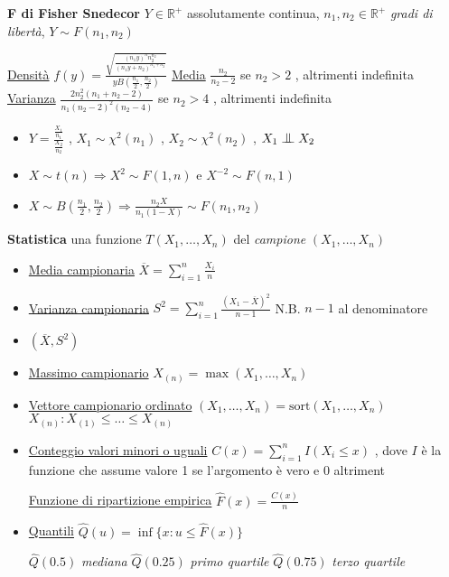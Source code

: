 \documentclass[openany]{book} %
\newcommand{\ind}{\mathrel{\text{\scalebox{1.07}{$\perp\mkern-10mu\perp$}}}}
\begin{document}
\textbf{F di Fisher Snedecor} $Y\in \mathbb{R}^+$ assolutamente continua, $n_1,n_2\in \mathbb{R}^+$ \textit{gradi di libertà}, $Y\sim F(n_1,n_2)$

\underline{Densità} $f(y)=\frac{\sqrt{\frac{(n_1y)^nn_2^{n_2}}{(n_1y+n_2)^{n_1+n_2}}}}{yB(\frac{n_1}{2},\frac{n_2}{2})}$ \qquad \underline{Media} $\frac{n_2}{n_2-2}$ se $n_2>2$ , altrimenti indefinita \qquad \underline{Varianza} $\frac{2n_2^2(n_1+n_2-2)}{n_1(n_2-2)^2(n_2-4)}$ se $n_2>4$ , altrimenti indefinita

\begin{itemize}

	\item $Y=\frac{\frac{X_1}{n_1}}{\frac{X_2}{n_2}}$ , $X _1\sim\chi^2(n_1)$ , $X_2\sim\chi^2(n_2)$ , $X_1\ind X_2$

	\item $X\sim t(n) \Rightarrow X^2\sim F(1,n)$ e $X^{-2}\sim F(n,1)$

	\item $X\sim B(\frac{n_1}{2},\frac{n_2}{2}) \Rightarrow \frac{n_2X}{n_1(1-X)}\sim F(n_1,n_2)$

\end{itemize}

\textbf{Statistica} una funzione $T(X_1,\dots,X_n)$ del \textit{campione} $(X_1,\dots,X_n)$

\begin{itemize}

	\item \underline{Media campionaria} $\overline{X}=\sum_{i=1}^n \frac{X_i}{n}$

	\item \underline{Varianza campionaria} $S^2=\sum_{i=1}^n \frac{(X_1-\overline {X})^2}{n-1}$ N.B. $n-1$ al denominatore

	\item $(\overline {X},S^2)$

	\item \underline{Massimo campionario} $X_{(n)}=\max(X_1,\dots,X_n)$

	\item \underline{Vettore campionario ordinato} $(X_1,\dots,X_n)=\text{sort}(X_1,\dots,X_n)$ \quad $X_{(n)}:X_{(1)}\leq\dots\leq X_{(n)}$

	\item \underline{Conteggio valori minori o uguali} $C(x)=\sum_{i=1}^nI(X_i\leq x)$ , dove $I$ è la funzione che assume valore 1 se l'argomento è vero e 0 altriment

	      \underline{Funzione di ripartizione empirica} $\hat {F}(x)=\frac{C(x)}{n}$

	\item \underline{Quantili} $\hat {Q}(u)=\inf\{x:u\leq\hat {F}(x)\}$

	      $\hat {Q}(0.5)$ \textit{mediana} \quad $\hat {Q}(0.25)$ \textit{primo quartile} \quad $\hat {Q}(0.75)$ \textit{terzo quartile}

\end{itemize}
\end{document}

